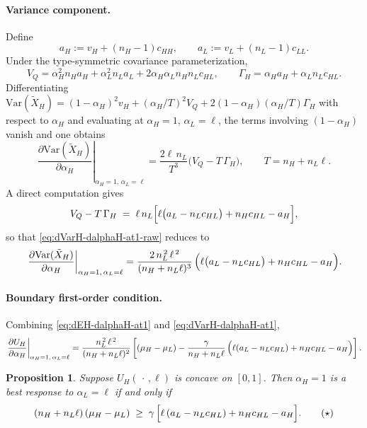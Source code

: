 \documentclass[a4paper,12pt]{article}
\newtheorem{proposition}[theorem]{Proposition}
\theoremstyle{definition}
\theoremstyle{remark}
\newcommand{\Var}{\mathrm{Var}}
\newcommand{\1}{\mathbf{1}}
\begin{document}
\paragraph{Variance component.}
Define
\[
a_H:=v_H+(n_H-1)c_{HH},
\qquad
a_L:=v_L+(n_L-1)c_{LL}.
\]
Under the type-symmetric covariance parameterization,
\[
V_Q=\alpha_H^2 n_Ha_H+\alpha_L^2 n_La_L+2\alpha_H\alpha_L n_Hn_L c_{HL},
\qquad
\Gamma_H=\alpha_H a_H+\alpha_L n_L c_{HL}.
\]
Differentiating
\(\Var(\tilde X_H)=(1-\alpha_H)^2v_H+(\alpha_H/T)^2V_Q+2(1-\alpha_H)(\alpha_H/T)\Gamma_H\)
with respect to \(\alpha_H\) and evaluating at \(\alpha_H=1\),
\(\alpha_L=\ell\), the terms involving \((1-\alpha_H)\) vanish and one
obtains
\begin{equation}
\left.\frac{\partial \Var(\tilde X_H)}{\partial \alpha_H}\right|_{\alpha_H=1,\,\alpha_L=\ell}
=
\frac{2\ell\,n_L}{T^3}\bigl(V_Q-T\,\Gamma_H\bigr),
\qquad T=n_H+n_L\ell.
\label{eq:dVarH-dalphaH-at1-raw}
\end{equation}
A direct computation gives
\[
V_Q-T\,\Gamma_H \;=\; \ell\,n_L\Bigl[\ell\bigl(a_L-n_Lc_{HL}\bigr)
+n_Hc_{HL}-a_H\Bigr],
\]
so that \eqref{eq:dVarH-dalphaH-at1-raw} reduces to
\begin{equation}
\left.\frac{\partial \Var(\tilde X_H)}{\partial \alpha_H}\right|_{\alpha_H=1,\,\alpha_L=\ell}
=
\frac{2\,n_L^{\,2}\,\ell^{\,2}}{(n_H+n_L\ell)^{3}}\,
\Bigl(\ell\bigl(a_L-n_Lc_{HL}\bigr)+n_Hc_{HL}-a_H\Bigr).
\label{eq:dVarH-dalphaH-at1}
\end{equation}

\paragraph{Boundary first-order condition.}
Combining \eqref{eq:dEH-dalphaH-at1} and \eqref{eq:dVarH-dalphaH-at1},
\begin{equation}
\left.\frac{\partial U_H}{\partial \alpha_H}\right|_{\alpha_H=1,\,\alpha_L=\ell}
=
\frac{n_L^{\,2}\,\ell^{\,2}}{(n_H+n_L\ell)^{2}}
\left[
(\mu_H-\mu_L)
-
\frac{\gamma}{n_H+n_L\ell}\,
\Bigl(\ell(a_L-n_Lc_{HL})+n_Hc_{HL}-a_H\Bigr)
\right].
\label{eq:dUH-dalphaH-at1}
\end{equation}

\begin{proposition}\label{prop:alphaH1-bestresponse}
Suppose \(U_H(\,\cdot\,,\ell)\) is concave on \([0,1]\). Then \(\alpha_H=1\)
is a best response to \(\alpha_L=\ell\) if and only if
\begin{equation}\label{eq:star-condition}
(n_H+n_L\ell)\,(\mu_H-\mu_L)
\;\ge\;
\gamma\,\Bigl[\ell\,(a_L-n_Lc_{HL})+n_Hc_{HL}-a_H\Bigr].
\tag{$\star$}
\end{equation}
\end{proposition}
\end{document}
